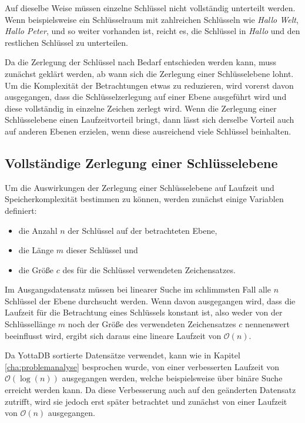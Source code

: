 \documentclass[oneside]{ausarbeitung}
\begin{document}
Auf dieselbe Weise müssen einzelne Schlüssel nicht vollständig unterteilt werden. Wenn beispielsweise ein Schlüsselraum mit zahlreichen Schlüsseln wie \textit{Hallo Welt}, \textit{Hallo Peter}, und so weiter vorhanden ist, reicht es, die Schlüssel in \textit{Hallo} und den restlichen Schlüssel zu unterteilen. 

\pagebreak
	
Da die Zerlegung der Schlüssel nach Bedarf entschieden werden kann, muss zunächst geklärt werden, ab wann sich die Zerlegung einer Schlüsselebene lohnt. Um die Komplexität der Betrachtungen etwas zu reduzieren, wird vorerst davon ausgegangen, dass die Schlüsselzerlegung auf einer Ebene ausgeführt wird und diese vollständig in einzelne Zeichen zerlegt wird. Wenn die Zerlegung einer Schlüsselebene einen Laufzeitvorteil bringt, dann lässt sich derselbe Vorteil auch auf anderen Ebenen erzielen, wenn diese ausreichend viele Schlüssel beinhalten.
	
\subsection{Vollständige Zerlegung einer Schlüsselebene}
	
Um die Auswirkungen der Zerlegung einer Schlüsselebene auf Laufzeit und Speicherkomplexität bestimmen zu können, werden zunächst einige Variablen definiert:
\begin{itemize}
	\item die Anzahl $n$ der Schlüssel auf der betrachteten Ebene,
	\item die Länge $m$ dieser Schlüssel und
	\item die Größe $c$ des für die Schlüssel verwendeten Zeichensatzes.
\end{itemize}
	
Im Ausgangsdatensatz müssen bei linearer Suche im schlimmsten Fall alle $n$ Schlüssel der Ebene durchsucht werden. Wenn davon ausgegangen wird, dass die Laufzeit für die Betrachtung eines Schlüssels konstant ist, also weder von der Schlüssellänge $m$ noch der Größe des verwendeten Zeichensatzes $c$ nennenswert beeinflusst wird, ergibt sich daraus eine lineare Laufzeit von $\mathcal{O}(n)$. 
	
Da YottaDB sortierte Datensätze verwendet, kann wie in Kapitel \ref{cha:problemanalyse} besprochen wurde, von einer verbesserten Laufzeit von $\mathcal{O}(\log(n))$ ausgegangen werden, welche beispielsweise über binäre Suche erreicht werden kann. Da diese Verbesserung auch auf den geänderten Datensatz zutrifft, wird sie jedoch erst später betrachtet und zunächst von einer Laufzeit von $\mathcal{O}(n)$ ausgegangen.
	
\end{document}
